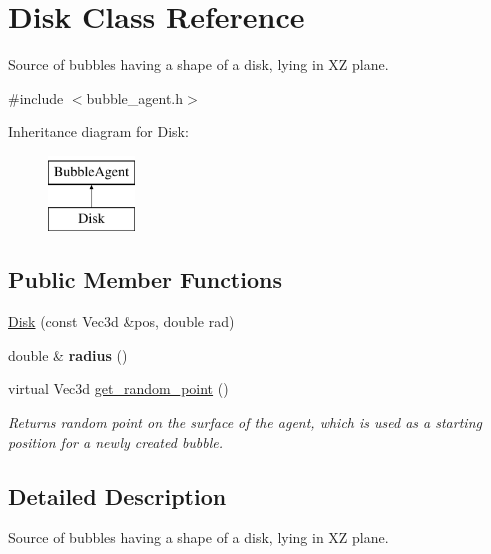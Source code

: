 \hypertarget{class_disk}{}\section{Disk Class Reference}
\label{class_disk}


Source of bubbles having a shape of a disk, lying in X\+Z plane.  




{\ttfamily \#include $<$bubble\+\_\+agent.\+h$>$}

Inheritance diagram for Disk\+:\begin{figure}[H]
\begin{center}
\leavevmode
\includegraphics[height=2.000000cm]{class_disk}
\end{center}
\end{figure}
\subsection*{Public Member Functions}
\begin{DoxyCompactItemize}
\item 
\hyperlink{class_disk_a253026ad11118d608e2858c9f63504c6}{Disk} (const Vec3d \&pos, double rad)
\item 
\hypertarget{class_disk_a92d35e24d034a0413dc5a3a25455c7de}{}double \& {\bfseries radius} ()\label{class_disk_a92d35e24d034a0413dc5a3a25455c7de}

\item 
\hypertarget{class_disk_aa1f4238a32897983f6735970a34f8126}{}virtual Vec3d \hyperlink{class_disk_aa1f4238a32897983f6735970a34f8126}{get\+\_\+random\+\_\+point} ()\label{class_disk_aa1f4238a32897983f6735970a34f8126}

\begin{DoxyCompactList}\small\item\em Returns random point on the surface of the agent, which is used as a starting position for a newly created bubble. \end{DoxyCompactList}\end{DoxyCompactItemize}


\subsection{Detailed Description}
Source of bubbles having a shape of a disk, lying in X\+Z plane. 

